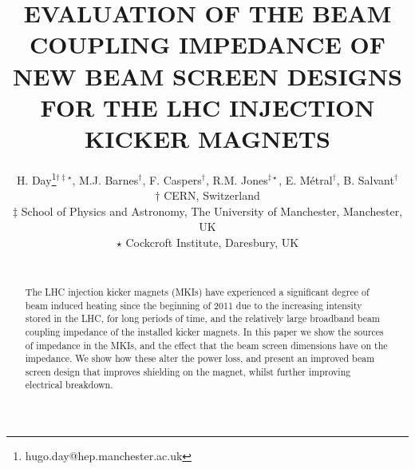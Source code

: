 \documentclass{JAC2003}
\begin{document}
\title{EVALUATION OF THE BEAM COUPLING IMPEDANCE OF NEW BEAM SCREEN DESIGNS FOR THE LHC INJECTION KICKER MAGNETS}
\author{H. Day\thanks{hugo.day@hep.manchester.ac.uk}$^{\dagger\ddagger\star}$, M.J. Barnes$^{\dagger}$, F. Caspers$^{\dagger}$, R.M. Jones$^{\ddagger \star}$, E. Métral$^{\dagger}$, B. Salvant$^{\dagger}$ \\
$\dagger$ CERN, Switzerland \\
$\ddagger$ School of Physics and Astronomy, The University of Manchester, Manchester, UK \\
$\star$ Cockcroft Institute, Daresbury, UK \\
\\}

\maketitle 


\begin{abstract}
The LHC injection kicker magnets (MKIs) have experienced a significant degree of beam induced heating since the beginning of 2011 due to the increasing intensity stored in the LHC, for long periods of time, and the relatively large broadband beam coupling impedance of the installed kicker magnets. In this paper we show the sources of impedance in the MKIs, and the effect that the beam screen dimensions have on the impedance. We show how these alter the power loss, and present an improved beam screen design that improves shielding on the magnet, whilst further improving electrical breakdown.
\end{abstract}


%
%
%
\end{document}
